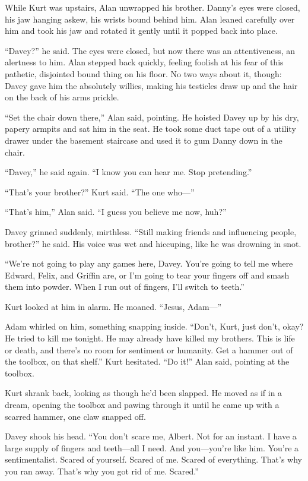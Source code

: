\documentclass{article}
\begin{document}
While Kurt was upstairs, Alan unwrapped his brother.  Danny's eyes
were closed, his jaw hanging askew, his wrists bound behind him.  Alan
leaned carefully over him and took his jaw and rotated it gently until
it popped back into place.

``Davey?'' he said.  The eyes were closed, but now there was an
attentiveness, an alertness to him.  Alan stepped back quickly,
feeling foolish at his fear of this pathetic, disjointed bound thing
on his floor.  No two ways about it, though:  Davey gave him the
absolutely willies, making his testicles draw up and the hair on the
back of his arms prickle.

``Set the chair down there,'' Alan said, pointing.  He hoisted Davey
up by his dry, papery armpits and sat him in the seat.  He took some
duct tape out of a utility drawer under the basement staircase and
used it to gum Danny down in the chair.

``Davey,'' he said again.  ``I know you can hear me.  Stop
pretending.''

``That's your brother?'' Kurt said.  ``The one who---''

``That's him,'' Alan said.  ``I guess you believe me now, huh?''

Davey grinned suddenly, mirthless.  ``Still making friends and
influencing people, brother?'' he said.  His voice was wet and
hiccuping, like he was drowning in snot.

``We're not going to play any games here, Davey.  You're going to tell
me where Edward, Felix, and Griffin are, or I'm going to tear your
fingers off and smash them into powder.  When I run out of fingers,
I'll switch to teeth.''

Kurt looked at him in alarm.  He moaned.  ``Jesus, Adam---''

Adam whirled on him, something snapping inside.  ``Don't, Kurt, just
don't, okay?  He tried to kill me tonight.  He may already have killed
my brothers.  This is life or death, and there's no room for sentiment
or humanity.  Get a hammer out of the toolbox, on that shelf.'' Kurt
hesitated.  ``Do it!'' Alan said, pointing at the toolbox.

Kurt shrank back, looking as though he'd been slapped.  He moved as if
in a dream, opening the toolbox and pawing through it until he came up
with a scarred hammer, one claw snapped off.

Davey shook his head.  ``You don't scare me, Albert.  Not for an
instant.  I have a large supply of fingers and teeth---all I need. 
And you---you're like him.  You're a sentimentalist.  Scared of
yourself.  Scared of me.  Scared of everything.  That's why you ran
away.  That's why you got rid of me.  Scared.''
\end{document}
